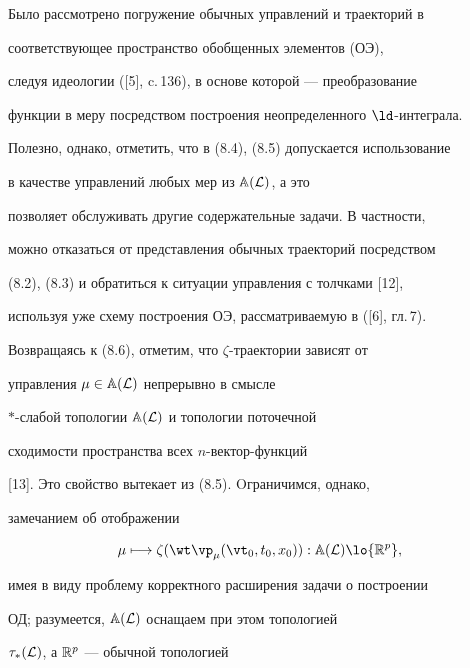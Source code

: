 \begin{notes}


Было рассмотрено погружение обычных управлений и траекторий в


соответствующее пространство обобщенных элементов (ОЭ),


следуя идеологии ([5], c.\,136), в основе которой --- преобразование


функции в меру посредством построения неопределенного $\ld$-интеграла.


Полезно, однако, отметить, что в (8.4), (8.5) допускается использование


в качестве управлений любых мер из ${\Bbb A}({\cal L})$, а это


позволяет обслуживать другие содержательные задачи. В частности,


можно отказаться от представления обычных траекторий посредством


(8.2), (8.3) и обратиться к ситуации управления с толчками [12],


используя уже схему построения ОЭ, рассматриваемую в ([6], гл.\,7).


\end{notes}





Возвращаясь к (8.6), отметим, что $\zeta$-траектории зависят от


управления $\mu \in {{\Bbb A}({\cal L})}$ непрерывно в смысле


$*$-слабой топологии ${\Bbb A}({\cal L})$ и топологии поточечной


сходимости пространства всех $n$-вектор-функций


[13]. Это свойство вытекает из (8.5). Oграничимся, однако,


замечанием об отображении


\begin{equation}


\mu \longmapsto {\zeta}({{\wt \vp}_\mu}({{\vt}_0},{t_0},{x_0})):


{{\Bbb A}({\cal L})} \lo {{\Bbb R}^p},


\end{equation}


имея в виду проблему корректного расширения задачи о построении


ОД; разумеется, ${\Bbb A}({\cal L})$ оснащаем при этом топологией


${{\tau}_*}({\cal L})$, а ${\Bbb R}^p$ --- обычной топологией


